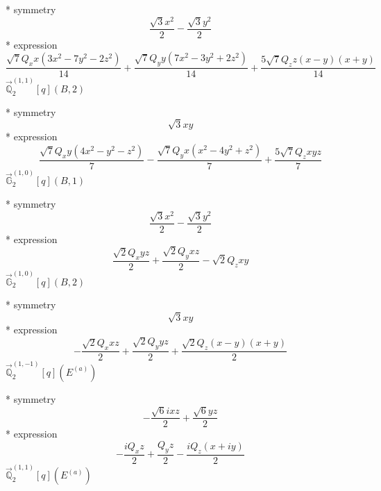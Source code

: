 \documentclass[fleqn,8pt]{jsarticle}
\begin{document}
\noindent\quad ** symmetry
\begin{dmath*}
\frac{\sqrt{3} x^{2}}{2} - \frac{\sqrt{3} y^{2}}{2}
\end{dmath*}
\noindent\quad ** expression
\begin{dmath*}
\frac{\sqrt{7} Q_{x} x \left(3 x^{2} - 7 y^{2} - 2 z^{2}\right)}{14} + \frac{\sqrt{7} Q_{y} y \left(7 x^{2} - 3 y^{2} + 2 z^{2}\right)}{14} + \frac{5 \sqrt{7} Q_{z} z \left(x - y\right) \left(x + y\right)}{14}
\end{dmath*}
\noindent\quad $\vec{\mathbb{Q}}_{2}^{(1,1)}[q](B,2)$

\noindent\quad ** symmetry
\begin{dmath*}
\sqrt{3} x y
\end{dmath*}
\noindent\quad ** expression
\begin{dmath*}
\frac{\sqrt{7} Q_{x} y \left(4 x^{2} - y^{2} - z^{2}\right)}{7} - \frac{\sqrt{7} Q_{y} x \left(x^{2} - 4 y^{2} + z^{2}\right)}{7} + \frac{5 \sqrt{7} Q_{z} x y z}{7}
\end{dmath*}
\noindent\quad $\vec{\mathbb{G}}_{2}^{(1,0)}[q](B,1)$

\noindent\quad ** symmetry
\begin{dmath*}
\frac{\sqrt{3} x^{2}}{2} - \frac{\sqrt{3} y^{2}}{2}
\end{dmath*}
\noindent\quad ** expression
\begin{dmath*}
\frac{\sqrt{2} Q_{x} y z}{2} + \frac{\sqrt{2} Q_{y} x z}{2} - \sqrt{2} Q_{z} x y
\end{dmath*}
\noindent\quad $\vec{\mathbb{G}}_{2}^{(1,0)}[q](B,2)$

\noindent\quad ** symmetry
\begin{dmath*}
\sqrt{3} x y
\end{dmath*}
\noindent\quad ** expression
\begin{dmath*}
- \frac{\sqrt{2} Q_{x} x z}{2} + \frac{\sqrt{2} Q_{y} y z}{2} + \frac{\sqrt{2} Q_{z} \left(x - y\right) \left(x + y\right)}{2}
\end{dmath*}
\noindent\quad $\vec{\mathbb{Q}}_{2}^{(1,-1)}[q](E^{(a)})$

\noindent\quad ** symmetry
\begin{dmath*}
- \frac{\sqrt{6} i x z}{2} + \frac{\sqrt{6} y z}{2}
\end{dmath*}
\noindent\quad ** expression
\begin{dmath*}
- \frac{i Q_{x} z}{2} + \frac{Q_{y} z}{2} - \frac{i Q_{z} \left(x + i y\right)}{2}
\end{dmath*}
\noindent\quad $\vec{\mathbb{Q}}_{2}^{(1,1)}[q](E^{(a)})$
\end{document}

